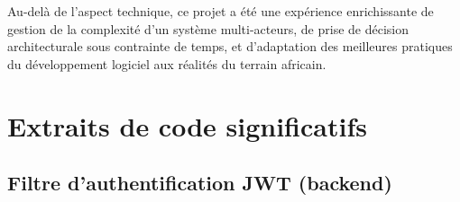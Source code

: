 \documentclass[12pt, a4paper, oneside]{report}
\begin{document}
Au-delà de l'aspect technique, ce projet a été une expérience enrichissante de gestion de
la complexité d'un système multi-acteurs, de prise de décision architecturale sous
contrainte de temps, et d'adaptation des meilleures pratiques du développement logiciel
aux réalités du terrain africain.

\appendix
\chapter{Extraits de code significatifs}

\section{Filtre d'authentification JWT (backend)}
\end{document}
